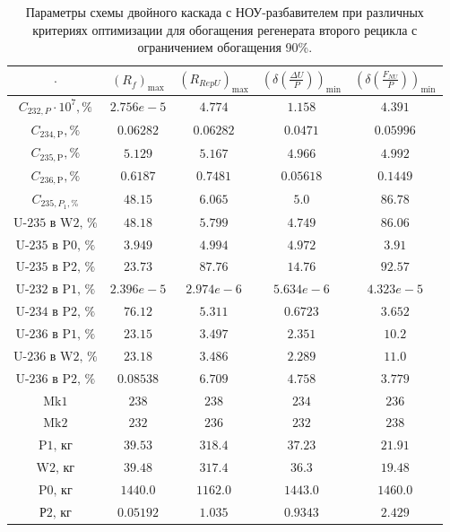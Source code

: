 \begin{table}
    \begin{tabular}{ccccc}
    $\cdot$ & $(R_f)_\text{max}$ & $(R_{RepU})_\text{max}$ & $(\delta(\frac{\Delta U}{P}))_\text{min}$ & $(\delta(\frac{F_{NU}}{P}))_\text{min}$\\ \hline
    $C_{232,P}\cdot10^{7}, \%$ & $2.756e-5$ & $4.774$ & $1.158$ & $4.391$\\ \hline
    $C_{234,\text{P}}, \%$ & $0.06282$ & $0.06282$ & $0.0471$ & $0.05996$\\ \hline
    $C_{235,\text{P}}, \%$ & $5.129$ & $5.167$ & $4.966$ & $4.992$\\ \hline
    $C_{236,\text{P}}, \%$ & $0.6187$ & $0.7481$ & $0.05618$ & $0.1449$\\ \hline
    $C_{235,P_1, \%}$ & $48.15$ & $6.065$ & $5.0$ & $86.78$\\ \hline
    $\text{U-235 в W2, \%}$ & $48.18$ & $5.799$ & $4.749$ & $86.06$\\ \hline
    $\text{U-235 в P0, \%}$ & $3.949$ & $4.994$ & $4.972$ & $3.91$\\ \hline
    $\text{U-235 в P2, \%}$ & $23.73$ & $87.76$ & $14.76$ & $92.57$\\ \hline
    $\text{U-232 в P1, \%}$ & $2.396e-5$ & $2.974e-6$ & $5.634e-6$ & $4.323e-5$\\ \hline
    $\text{U-234 в P2, \%}$ & $76.12$ & $5.311$ & $0.6723$ & $3.652$\\ \hline
    $\text{U-236 в P1, \%}$ & $23.15$ & $3.497$ & $2.351$ & $10.2$\\ \hline
    $\text{U-236 в W2, \%}$ & $23.18$ & $3.486$ & $2.289$ & $11.0$\\ \hline
    $\text{U-236 в P2, \%}$ & $0.08538$ & $6.709$ & $4.758$ & $3.779$\\ \hline
    $\text{Mk1}$ & $238$ & $238$ & $234$ & $236$\\ \hline
    $\text{Mk2}$ & $232$ & $236$ & $232$ & $238$\\ \hline
    $\text{P1, кг}$ & $39.53$ & $318.4$ & $37.23$ & $21.91$\\ \hline
    $\text{W2, кг}$ & $39.48$ & $317.4$ & $36.3$ & $19.48$\\ \hline
    $\text{P0, кг}$ & $1440.0$ & $1162.0$ & $1443.0$ & $1460.0$\\ \hline
    $\text{Р2, кг}$ & $0.05192$ & $1.035$ & $0.9343$ & $2.429$\\ \hline
\end{tabular}
\caption{Параметры схемы двойного каскада с НОУ-разбавителем при различных критериях оптимизации для обогащения регенерата второго рецикла с ограничением обогащения 90\%.{\label{2opt2_90}}}
\end{table}


